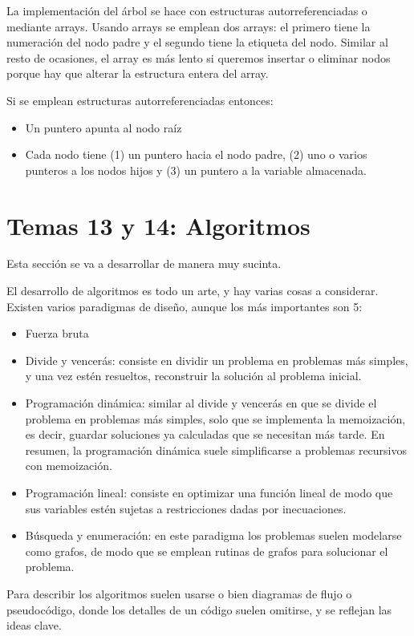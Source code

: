 \documentclass[a4paper]{article}
\begin{document}
	La implementación del árbol se hace con estructuras autorreferenciadas o mediante arrays. Usando arrays se emplean dos arrays: el primero tiene la numeración del nodo padre y el segundo tiene la etiqueta del nodo. Similar al resto de ocasiones, el array es más lento si queremos insertar o eliminar nodos porque hay que alterar la estructura entera del array.
	
	Si se emplean estructuras autorreferenciadas entonces:
	\begin{itemize}
		\item Un puntero apunta al nodo raíz
		\item Cada nodo tiene (1) un puntero hacia el nodo padre, (2) uno o varios punteros a los nodos hijos y (3) un puntero a la variable almacenada.
	\end{itemize}
	
	
	\section{Temas 13 y 14: Algoritmos}
	Esta sección se va a desarrollar de manera muy sucinta.
	
	El desarrollo de algoritmos es todo un arte, y hay varias cosas a considerar. Existen varios paradigmas de diseño, aunque los más importantes son 5:
	\begin{itemize}
		\item Fuerza bruta
		\item Divide y vencerás: consiste en dividir un problema en problemas más simples, y una vez estén resueltos, reconstruir la solución al problema inicial.
		\item Programación dinámica: similar al divide y vencerás en que se divide el problema en problemas más simples, solo que se implementa la memoización, es decir, guardar soluciones ya calculadas que se necesitan más tarde. En resumen, la programación dinámica suele simplificarse a problemas recursivos con memoización.
		\item Programación lineal: consiste en optimizar una función lineal de modo que sus variables estén sujetas a restricciones dadas por inecuaciones.
		\item Búsqueda y enumeración: en este paradigma los problemas suelen modelarse como grafos, de modo que se emplean rutinas de grafos para solucionar el problema.
	\end{itemize}

	Para describir los algoritmos suelen usarse o bien diagramas de flujo o pseudocódigo, donde los detalles de un código suelen omitirse, y se reflejan las ideas clave.
	
\end{document}
